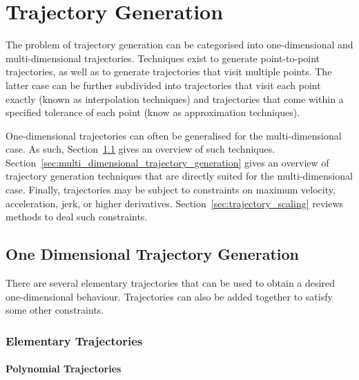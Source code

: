 \section{Trajectory Generation}%
\label{sec:trajectory_generation}

	The problem of trajectory generation can be categorised into one-dimensional
	and multi-dimensional trajectories. Techniques exist to generate
	point-to-point trajectories, as well as to generate trajectories that visit
	multiple points. The latter case can be further subdivided into trajectories
	that visit each point exactly (known as interpolation techniques) and
	trajectories that come within a specified tolerance of each point (know as
	approximation techniques). 

	One-dimensional trajectories can often be generalised for the
	multi-dimensional case. As such,
	Section~\ref{sec:one_dimensional_trajectory_generation} gives an overview of
	such techniques. Section~\ref{sec:multi_dimensional_trajectory_generation}
	gives an overview of trajectory generation techniques that are directly
	suited for the multi-dimensional case. Finally, trajectories may be subject
	to constraints on maximum velocity, acceleration, jerk, or higher
	derivatives.  Section~\ref{sec:trajectory_scaling} reviews methods to deal
	such constraints.

	\subsection{One Dimensional Trajectory Generation}%
	\label{sec:one_dimensional_trajectory_generation}

		There are several elementary trajectories that can be used to obtain a
		desired one-dimensional behaviour. Trajectories can also be added
		together to satisfy some other constraints. 


		\subsubsection{Elementary Trajectories}%
		\label{sec:elementary_trajectories}

			\paragraph{Polynomial Trajectories}%
			\label{sec:polynomial_trajectories}

